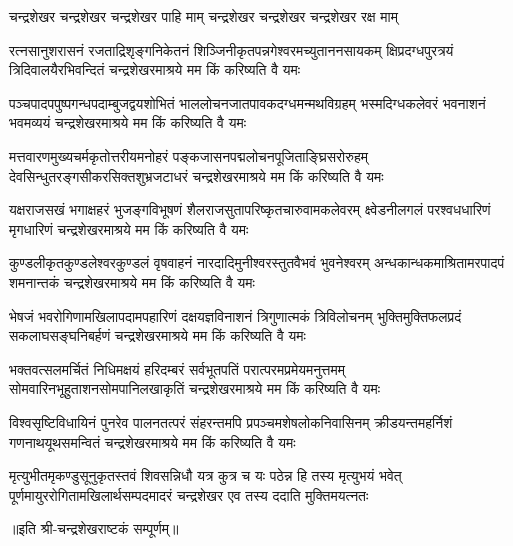 

\twolineshloka
{चन्द्रशेखर चन्द्रशेखर चन्द्रशेखर पाहि माम्}
{चन्द्रशेखर चन्द्रशेखर चन्द्रशेखर रक्ष माम्} %

\fourlineindentedshloka
{रत्नसानुशरासनं रजताद्रिशृङ्गनिकेतनं}
{शिञ्जिनीकृतपन्नगेश्वरमच्युताननसायकम्}
{क्षिप्रदग्धपुरत्रयं त्रिदिवालयैरभिवन्दितं}
{चन्द्रशेखरमाश्रये मम किं करिष्यति वै यमः} %

\fourlineindentedshloka
{पञ्चपादपपुष्पगन्धपदाम्बुजद्वयशोभितं}
{भाललोचनजातपावकदग्धमन्मथविग्रहम्}
{भस्मदिग्धकलेवरं भवनाशनं भवमव्ययं}
{चन्द्रशेखरमाश्रये मम किं करिष्यति वै यमः} %

\fourlineindentedshloka
{मत्तवारणमुख्यचर्मकृतोत्तरीयमनोहरं}
{पङ्कजासनपद्मलोचनपूजिताङ्घ्रिसरोरुहम्}
{देवसिन्धुतरङ्गसीकरसिक्तशुभ्रजटाधरं}
{चन्द्रशेखरमाश्रये मम किं करिष्यति वै यमः} %

\fourlineindentedshloka
{यक्षराजसखं भगाक्षहरं भुजङ्गविभूषणं}
{शैलराजसुतापरिष्कृतचारुवामकलेवरम्}
{क्ष्वेडनीलगलं परश्वधधारिणं मृगधारिणं}
{चन्द्रशेखरमाश्रये मम किं करिष्यति वै यमः} %

\fourlineindentedshloka
{कुण्डलीकृतकुण्डलेश्वरकुण्डलं वृषवाहनं}
{नारदादिमुनीश्वरस्तुतवैभवं भुवनेश्वरम्}
{अन्धकान्धकमाश्रितामरपादपं शमनान्तकं}
{चन्द्रशेखरमाश्रये मम किं करिष्यति वै यमः} %

\fourlineindentedshloka
{भेषजं भवरोगिणामखिलापदामपहारिणं}
{दक्षयज्ञविनाशनं त्रिगुणात्मकं त्रिविलोचनम्}
{भुक्तिमुक्तिफलप्रदं सकलाघसङ्घनिबर्हणं}
{चन्द्रशेखरमाश्रये मम किं करिष्यति वै यमः} %

\fourlineindentedshloka
{भक्तवत्सलमर्चितं निधिमक्षयं हरिदम्बरं}
{सर्वभूतपतिं परात्परमप्रमेयमनुत्तमम्}
{सोमवारिनभूहुताशनसोमपानिलखाकृतिं}
{चन्द्रशेखरमाश्रये मम किं करिष्यति वै यमः} %

\fourlineindentedshloka
{विश्वसृष्टिविधायिनं पुनरेव पालनतत्परं}
{संहरन्तमपि प्रपञ्चमशेषलोकनिवासिनम्}
{क्रीडयन्तमहर्निशं गणनाथयूथसमन्वितं}
{चन्द्रशेखरमाश्रये मम किं करिष्यति वै यमः} %

\fourlineindentedshloka
{मृत्युभीतमृकण्डुसूनुकृतस्तवं शिवसन्निधौ}
{यत्र कुत्र च यः पठेन्न हि तस्य मृत्युभयं भवेत्}
{पूर्णमायुररोगितामखिलार्थसम्पदमादरं}
{चन्द्रशेखर एव तस्य ददाति मुक्तिमयत्नतः} %

{॥इति श्री-चन्द्रशेखराष्टकं सम्पूर्णम्॥}
